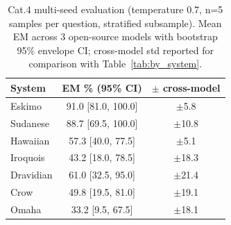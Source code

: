\begin{table}[t]
\centering
\caption{Cat.4 multi-seed evaluation (temperature 0.7, n=5 samples per question, stratified subsample). Mean EM across 3 open-source models with bootstrap 95\% envelope CI; cross-model std reported for comparison with Table~\ref{tab:by_system}.}
\label{tab:multi_seed_cat4}
\small
\begin{tabular}{lcc}
\toprule
\textbf{System} & \textbf{EM \% (95\% CI)} & \textbf{$\pm$ cross-model} \\
\midrule
Eskimo & 91.0 [81.0, 100.0] & $\pm$5.8 \\
Sudanese & 88.7 [69.5, 100.0] & $\pm$10.8 \\
Hawaiian & 57.3 [40.0, 77.5] & $\pm$5.1 \\
Iroquois & 43.2 [18.0, 78.5] & $\pm$18.3 \\
Dravidian & 61.0 [32.5, 95.0] & $\pm$21.4 \\
Crow & 49.8 [19.5, 81.0] & $\pm$19.1 \\
Omaha & 33.2 [9.5, 67.5] & $\pm$18.1 \\
\bottomrule
\end{tabular}
\end{table}
